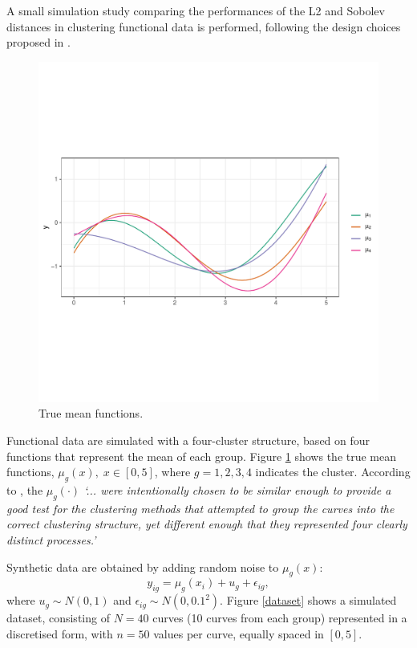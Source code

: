 \documentclass[smallextended,natbib]{svjour3}\usepackage[]{graphicx}\usepackage[]{xcolor}
\begin{document}
A small simulation study comparing the performances of the L2 and Sobolev distances in clustering functional data is performed, following the design choices proposed in \cite{hitchcock2007effect}. 
\begin{figure}[hbpt]
\centering
\includegraphics[trim=0cm 4cm 0cm 3cm, clip, scale=.6]{figures/fig-simstudy1.pdf}
\caption{True mean functions. \label{meanfun} }
\end{figure}

Functional data are simulated with a four-cluster structure, based on four functions that represent the mean of each group. Figure \ref{meanfun} shows the true mean functions, $\mu_g(x), \; x \in \left[0, 5\right]$, where $g=1,2,3,4$ indicates the cluster. According to \cite{hitchcock2007effect}, the $\mu_g(\cdot)$ \textit{`... were intentionally chosen to be similar enough to provide a good test for the clustering methods that attempted to group the curves into the correct clustering structure, yet different enough that they represented four clearly distinct
processes.'}

Synthetic data are obtained by adding random noise to $\mu_g(x)$:  
\[ y_{ig} = \mu_g(x_i) + u_g + \epsilon_{ig}, \]
where $u_g \sim N(0, 1)$ and $\epsilon_{ig} \sim N(0, 0.1^2)$. Figure \ref{dataset} shows a simulated dataset, consisting of $N=40$ curves (10 curves from each group) represented in a discretised form, with $n=50$ values per curve, equally spaced in $\left[0, 5\right]$.  
\end{document}
